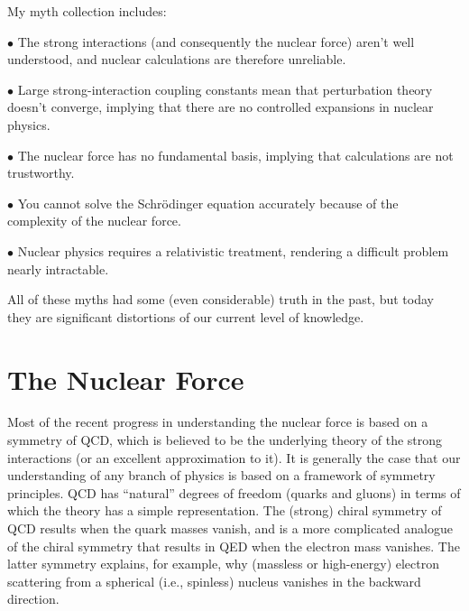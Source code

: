 \documentclass{svmult}
\begin{document}
My myth collection includes:

$\bullet$  The strong interactions (and consequently the nuclear force) aren't
well understood, and nuclear calculations are therefore unreliable.

$\bullet$ Large strong-interaction coupling constants mean that perturbation
theory doesn't converge, implying that there are no controlled expansions in
nuclear physics.

$\bullet$  The nuclear force has no fundamental basis, implying that
calculations are not trustworthy.

$\bullet$  You cannot solve the Schr\"odinger equation accurately because of the
complexity of the nuclear force.

$\bullet$  Nuclear physics requires a relativistic treatment, rendering a
difficult problem nearly intractable.

All of these myths had some (even considerable) truth in the past, but today
they are significant distortions of our current level of knowledge.

\section{The Nuclear Force}

Most of the recent progress in understanding the nuclear force is based on a
symmetry of QCD, which is believed to be the underlying theory of the
strong interactions (or an excellent approximation to it).  It is generally the
case that our understanding of any branch of physics is based on a framework of
symmetry principles. QCD has ``natural'' degrees of freedom (quarks and gluons)
in terms of which the theory has a simple representation.  The (strong) chiral
symmetry of QCD results when the quark masses
vanish,  and is a more complicated analogue of the chiral symmetry that results
in QED when the electron mass vanishes.  The
latter symmetry explains, for example, why (massless or high-energy) electron
scattering from a spherical (i.e., spinless) nucleus vanishes in the backward
direction.
\end{document}
